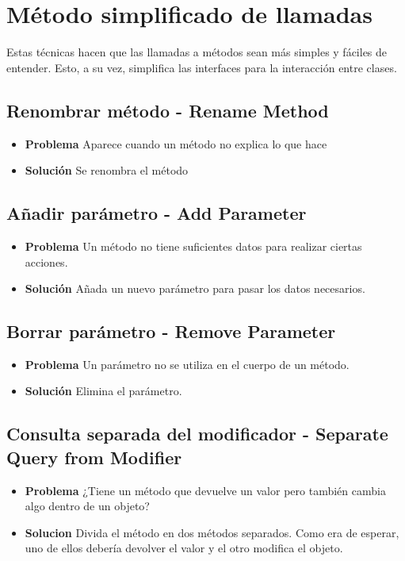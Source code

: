 \documentclass[11pt,a4paper,oneside]{book}
\begin{document}
\section{Método simplificado de llamadas}

Estas técnicas hacen que las llamadas a métodos sean más simples y fáciles de entender. Esto, a su vez, simplifica las interfaces para la interacción entre clases.

\subsection{Renombrar método - Rename Method}
\label{renombrarmetodo}
\begin{itemize}
    \item \textbf{Problema} Aparece cuando un método no explica lo que hace 
    \item \textbf{Solución} Se renombra el método
\end{itemize}

\subsection{Añadir parámetro - Add Parameter}
\label{anadirparametro}
\begin{itemize}
    \item \textbf{Problema} Un método no tiene suficientes datos para realizar ciertas acciones.
    \item \textbf{Solución} Añada un nuevo parámetro para pasar los datos necesarios.
\end{itemize}
    
\subsection{Borrar parámetro - Remove Parameter}
\label{borrarparametro}
\begin{itemize}
    \item \textbf{Problema} Un parámetro no se utiliza en el cuerpo de un método.
    \item \textbf{Solución} Elimina el parámetro.
\end{itemize}

\subsection{Consulta separada del modificador - Separate Query from Modifier}
\label{consultaseparadamodificador}
\begin{itemize}
    \item \textbf{Problema} ¿Tiene un método que devuelve un valor pero también cambia algo dentro de un objeto?
    \item \textbf{Solucion} Divida el método en dos métodos separados. Como era de esperar, uno de ellos debería devolver el valor y el otro modifica el objeto.
\end{itemize}
\end{document}
